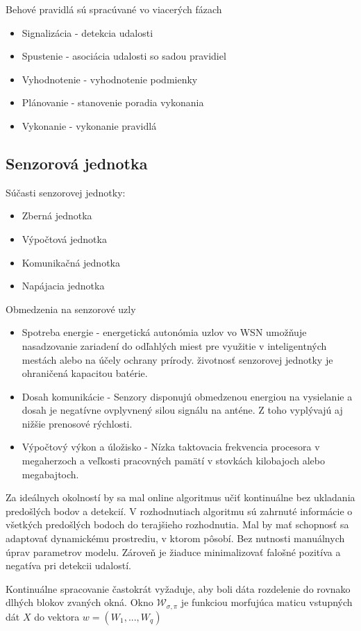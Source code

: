 Behové pravidlá sú spracúvané vo viacerých fázach
\begin{itemize}
\item Signalizácia - detekcia udalosti
\item Spustenie - asociácia udalosti so sadou pravidiel
\item Vyhodnotenie - vyhodnotenie podmienky
\item Plánovanie - stanovenie poradia vykonania
\item Vykonanie - vykonanie pravidlá
\end{itemize}
\cite{processing-information-flows}

\subsection{Senzorová jednotka}

Súčasti senzorovej jednotky:
\begin{itemize}
\item Zberná jednotka
\item Výpočtová jednotka
\item Komunikačná jednotka
\item Napájacia jednotka
\end{itemize}

Obmedzenia na senzorové uzly 
\begin{itemize}
\item Spotreba energie - energetická autonómia uzlov vo WSN umožňuje nasadzovanie zariadení do odľahlých miest pre využitie v inteligentných mestách alebo na účely ochrany prírody. životnosť senzorovej jednotky je ohraničená kapacitou batérie.
\item Dosah komunikácie - Senzory disponujú obmedzenou energiou na vysielanie a dosah je negatívne ovplyvnený silou signálu na anténe. Z toho vyplývajú aj nižšie prenosové rýchlosti.
\item Výpočtový výkon a úložisko - Nízka taktovacia frekvencia procesora v megaherzoch a veľkosti pracovných pamätí v stovkách kilobajoch alebo megabajtoch.
\end{itemize}
\cite{big-data-collection-wsn}


Za ideálnych okolností by sa mal online algoritmus učiť kontinuálne bez ukladania predošlých bodov a detekcií.
V rozhodnutiach algoritmu sú zahrnuté informácie o všetkých predošlých bodoch do terajšieho rozhodnutia. Mal by mať schopnosť sa adaptovať dynamickému prostrediu, v ktorom pôsobí. Bez nutnosti manuálnych úprav parametrov modelu. Zároveň je žiaduce minimalizovať falošné pozitíva a negatíva pri detekcii udalostí.

Kontinuálne spracovanie častokrát vyžaduje, aby boli dáta rozdelenie do rovnako dlhých blokov zvaných okná. Okno $\mathcal{W}_{\sigma, \pi}$ je funkciou morfujúca maticu vstupných dát $X$ do vektora $w = (W_1, ... , W_q)$  \cite{online-anomaly-detection}

	
\emptypage 
